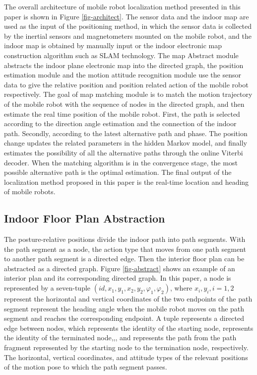 \documentclass{llncs}
\begin{document}
The overall architecture of mobile robot localization method presented in this paper is shown in Figure \ref{fig-architect}. The sensor data and the indoor map are used as the input of the positioning method, in which the sensor data is collected by the inertial sensors and magnetometers mounted on the mobile robot, and the indoor map is obtained by manually input or the indoor electronic map construction algorithm such as SLAM technology. The map Abstract module abstracts the indoor plane electronic map into the directed graph, the position estimation module and the motion attitude recognition module use the sensor data to give the relative position and position related action of the mobile robot respectively. The goal of map matching module is to match the motion trajectory of the mobile robot with the sequence of nodes in the directed graph, and then estimate the real time position of the mobile robot. First, the path is selected according to the direction angle estimation and the connection of the indoor path. Secondly, according to the latest alternative path and phase. The position change updates the related parameters in the hidden Markov model, and finally estimates the possibility of all the alternative paths through the online Viterbi decoder. When the matching algorithm is in the convergence stage, the most possible alternative path is the optimal estimation. The final output of the localization method proposed in this paper is the real-time location and heading of mobile robots.

\subsection{Indoor Floor Plan Abstraction}

The posture-relative positions divide the indoor path into path segments. With the path segment as a node, the action type that moves from one path segment to another path segment is a directed edge. Then the interior floor plan can be abstracted as a directed graph. Figure \ref{fig-abstract} shows an example of an interior plan and its corresponding directed graph. In this paper, a node is represented by a seven-tuple $(id,{x_1},{y_1},{x_2},{y_2},{\varphi _1},{\varphi _2})$, where ${x_i},{y_i},i = 1,2$ represent the horizontal and vertical coordinates of the two endpoints of the path segment represent the heading angle when the mobile robot moves on the path segment and reaches the corresponding endpoint. A tuple represents a directed edge between nodes, which represents the identity of the starting node, represents the identity of the terminated node,,, and represents the path from the path fragment represented by the starting node to the termination node, respectively. The horizontal, vertical coordinates, and attitude types of the relevant positions of the motion pose to which the path segment passes.
\end{document}
